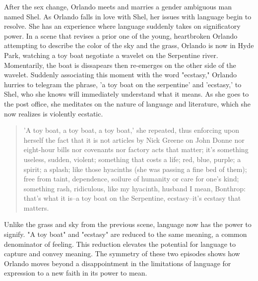 \documentclass[11pt]{article}
\begin{document}
After the sex change, Orlando meets and marries a gender ambiguous man
named Shel. As Orlando falls in love with Shel, her issues with
language begin to resolve. She has an experience where language
suddenly takes on significatory power. In a scene that revises a prior
one of the young, heartbroken Orlando attempting to describe the color
of the sky and the grass, Orlando is now in Hyde Park, watching a toy
boat negotiate a wavelet on the Serpentine river. Momentarily, the
boat is dissapears then re-emerges on the other side of the
wavelet. Suddenly associating this moment with the word "ecstasy,"
Orlando hurries to telegram the phrase, 'a toy boat on the serpentine'
and 'ecstasy,' to Shel, who she knows will immediately understand what
it means. As she goes to the post office, she meditates on the nature
of language and literature, which she now realizes is violently
ecstatic.
\begin{quote}
'A toy boat, a toy boat, a toy boat,' she repeated, thus enforcing upon
herself the fact that it is not articles by Nick Greene on John Donne nor
eight-hour bills nor covenants nor factory acts that matter; it's
something useless, sudden, violent; something that costs a life; red,
blue, purple; a spirit; a splash; like those hyacinths (she was passing a
fine bed of them); free from taint, dependence, soilure of humanity or
care for one's kind; something rash, ridiculous, like my hyacinth,
husband I mean, Bonthrop: that's what it is--a toy boat on the
Serpentine, ecstasy--it's ecstasy that matters. 
\end{quote}
Unlike the grass and sky from the previous scene, language now has the
power to signify. "A toy boat" and "ecstasy" are reduced to the same
meaning, a common denominator of feeling. This reduction elevates the
potential for language to capture and convey meaning. The symmetry of
these two episodes shows how Orlando moves beyond a disappointment in
the limitations of language for expression to a new faith in its power
to mean.
\end{document}

